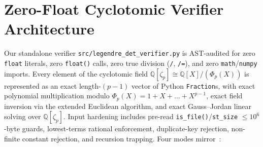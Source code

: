 \documentclass[10pt,twocolumn]{article}
\begin{document}
\section{Zero-Float Cyclotomic Verifier Architecture}
Our standalone verifier \nolinkurl{src/legendre_det_verifier.py} is AST-audited for zero \texttt{float} literals, zero \texttt{float()} calls, zero true division (\texttt{/}, \texttt{/=}), and zero \texttt{math}/\texttt{numpy} imports. Every element of the cyclotomic field $\mathbb{Q}[\zeta_p] \cong \mathbb{Q}[X]/(\Phi_p(X))$ is represented as an exact length-$(p-1)$ vector of Python \texttt{Fraction}s, with exact polynomial multiplication modulo $\Phi_p(X)=1+X+\dots+X^{p-1}$, exact field inversion via the extended Euclidean algorithm, and exact Gauss--Jordan linear solving over $\mathbb{Q}[\zeta_p]$. Input hardening includes pre-read \texttt{is\_file()}/\texttt{st\_size} $\le 10^6$-byte guards, lowest-terms rational enforcement, duplicate-key rejection, non-finite constant rejection, and recursion trapping. Four modes mirror~\cite{LeLanLiu2026}:
\end{document}
